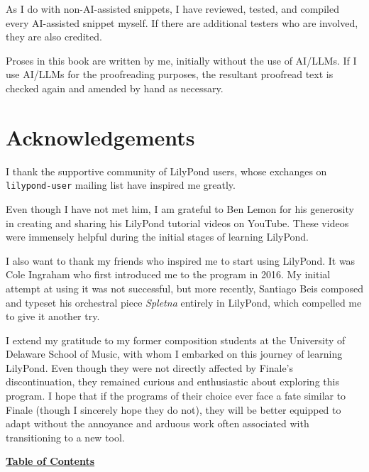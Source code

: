 As I do with non-AI-assisted snippets, I have reviewed, tested, and compiled every AI-assisted snippet myself. If there are additional testers who are involved, they are also credited.

Proses in this book are written by me, initially without the use of AI/LLMs. If I use AI/LLMs for the proofreading purposes, the resultant proofread text is checked again and amended by hand as necessary. 

\section{Acknowledgements}
I thank the supportive community of LilyPond users, whose exchanges on \Verb|lilypond-user| mailing list have inspired me greatly.

Even though I have not met him, I am grateful to Ben Lemon for his generosity in creating and sharing his LilyPond tutorial videos on YouTube. These videos were immensely helpful during the initial stages of learning LilyPond.

I also want to thank my friends who inspired me to start using LilyPond. It was Cole Ingraham who first introduced me to the program in 2016. My initial attempt at using it was not successful, but more recently, Santiago Beis composed and typeset his orchestral piece \textit{Spletna} entirely in LilyPond, which compelled me to give it another try.

I extend my gratitude to my former composition students at the University of Delaware School of Music, with whom I embarked on this journey of learning LilyPond. Even though they were not directly affected by Finale's discontinuation, they remained curious and enthusiastic about exploring this program. I hope that if the programs of their choice ever face a fate similar to Finale (though I sincerely hope they do not), they will be better equipped to adapt without the annoyance and arduous work often associated with transitioning to a new tool. \par

\hyperref[sec:toc]{\textbf{Table of Contents}}


\clearpage
\vfill \break
